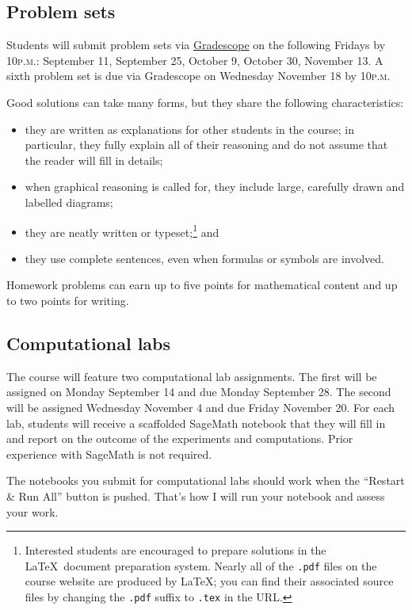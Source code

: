 \documentclass[11pt,twoside]{amsart}
\begin{document}
\subsection*{Problem sets}
Students will submit problem sets via \href{https://www.gradescope.com/courses/1385853}{Gradescope} on the following Fridays by 10\textsc{p.m.}: September 11, September 25, October 9, October 30, November 13. A sixth problem set is due via Gradescope on Wednesday November 18 by 10\textsc{p.m.}

Good solutions can take many forms, but they share the following characteristics:
\begin{itemize}
\item they are written as explanations for other students in the course; in particular, they fully explain all of their reasoning and do not assume that the reader will fill in details;
\item when graphical reasoning is called for, they include large, carefully drawn and labelled diagrams;
\item they are neatly written or typeset;\footnote{Interested students are 
encouraged to prepare solutions in the \LaTeX~document preparation 
system.  Nearly all of the \texttt{.pdf} files on the course website are produced by \LaTeX; you can find their associated source files by changing the \texttt{.pdf} suffix to \texttt{.tex} in the URL.} and
\item they use complete sentences, even when formulas or symbols are involved.
\end{itemize}

Homework problems can earn up to five points for mathematical content and up to two points for writing.

\subsection*{Computational labs}
The course will feature two computational lab assignments. The first will be assigned on Monday September 14 and due Monday September 28. The second will be assigned Wednesday November 4 and due Friday November 20. For each lab, students will receive a scaffolded SageMath notebook that they will fill in and report on the outcome of the experiments and computations. Prior experience with SageMath is not required.

The notebooks you submit for computational labs should work when the ``Restart \& Run All'' button is pushed. That's how I will run your notebook and assess your work.
\end{document}
